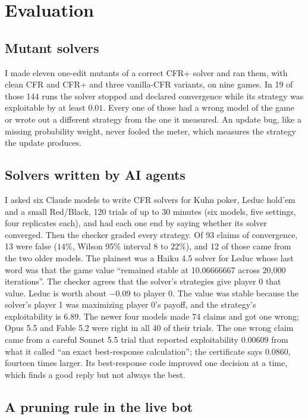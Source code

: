 \documentclass[11pt]{article}
\begin{document}
\section{Evaluation}

\subsection{Mutant solvers}\label{sec:mutants}

I made eleven
one-edit mutants of a correct CFR+ solver and ran them, with clean CFR and CFR+ and three
vanilla-CFR variants, on nine games. In 19 of those 144 runs the solver stopped and declared
convergence while its strategy was exploitable by at least $0.01$. Every one of those had a wrong
model of the game or wrote out a different strategy from the one it measured. An update bug, like
a missing probability weight, never fooled the meter, which measures the strategy the update produces.

\subsection{Solvers written by AI agents}\label{sec:agents}

I asked six Claude models to write CFR solvers for Kuhn poker, Leduc hold'em \cite{southey2005}
and a small Red/Black, 120 trials of up to 30 minutes (six models, five settings, four replicates
each), and had each one end by saying whether its
solver converged. Then the checker graded every strategy. Of 93 claims of convergence, 13 were
false ($14\%$, Wilson 95\% interval $8$ to $22\%$), and 12 of those came from the two older models.
The plainest was a Haiku 4.5 solver for Leduc whose last word was that the game value ``remained
stable at 10.06666667 across 20,000 iterations''. The checker agrees that the solver's strategies give player 0 that value. Leduc is worth about
$-0.09$ to player 0. The value was stable because the
solver's player 1 was maximizing player 0's payoff, and the strategy's exploitability is $6.89$. The newer four
models made 74 claims and got one wrong; Opus 5.5 and Fable 5.2 were right in all 40 of their
trials. The one wrong claim came from a careful Sonnet 5.5 trial that reported exploitability
$0.00609$ from what it called ``an exact best-response calculation''; the certificate says
$0.0860$, fourteen times larger. Its best-response code improved one decision at a time, which
finds a good reply but not always the best.

\subsection{A pruning rule in the live bot}\label{sec:guards}
\end{document}
